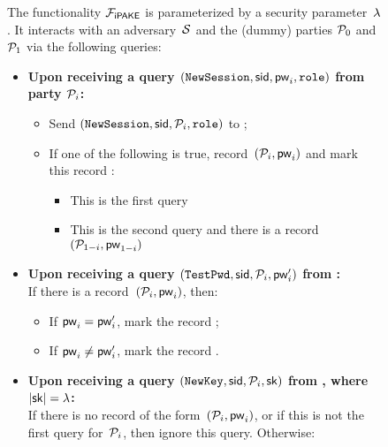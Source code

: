 \begin{figure}[tb]
  \centering
  \begin{fboxenv}
    \begin{minipage}{0.95\textwidth}
      The functionality $\mathcal{F}_\textsf{iPAKE}$ is parameterized by a security parameter~$\lambda$.
	  It interacts with an adversary~$\mathcal{S}$ and the (dummy) parties $\mathcal{P}_{0}$ and $\mathcal{P}_{1}$ via the following queries:\\[-1.8em]
      \begin{itemize}
      \item
        \textbf{Upon receiving a query
        $(\texttt{NewSession},\mathsf{sid},\mathsf{pw}_{i},\texttt{role})$ from party $\mathcal{P}_{i}$:}
        \begin{itemize}
          \item Send $(\texttt{NewSession},\mathsf{sid},\mathcal{P}_{i},\texttt{role})$ to \Sim;
          \item If one of the following is true, record~$(\mathcal{P}_{i},\mathsf{pw}_{i})$ and mark this record :
          \begin{itemize}
             \item This is the first \NewSession query %
             \item This is the second \NewSession query %
             and there is a record~$(\mathcal{P}_{1-i},\mathsf{pw}_{1-i})$
          \end{itemize}
        \end{itemize}
      \item
        \textbf{Upon receiving a query
        $(\texttt{TestPwd},\mathsf{sid},\mathcal{P}_{i},\mathsf{pw}_{i}')$ from \Sim{}:} \\
        If there is a  record~$(\mathcal{P}_{i},\mathsf{pw}_{i})$, then: 
        \begin{itemize}
          \item If $\mathsf{pw}_{i}=\mathsf{pw}_{i}'$, mark the record ;
          \item If $\mathsf{pw}_{i}\neq\mathsf{pw}_{i}'$, mark the record .
        \end{itemize}
      \item
        \textbf{Upon receiving a query
          $(\texttt{NewKey},\mathsf{sid},\mathcal{P}_{i},\mathsf{sk})$ from \Sim, where $|\mathsf{sk}|=\lambda$: } \\
        If there is no record of the form~$(\mathcal{P}_{i},\mathsf{pw}_{i})$, or if this is not the first \NewKey query for~$\mathcal{P}_{i}$, then ignore this query. 
	Otherwise:
        \begin{itemize}

\end{itemize}
\end{itemize}
\end{minipage}
\end{fboxenv}
\end{figure}
